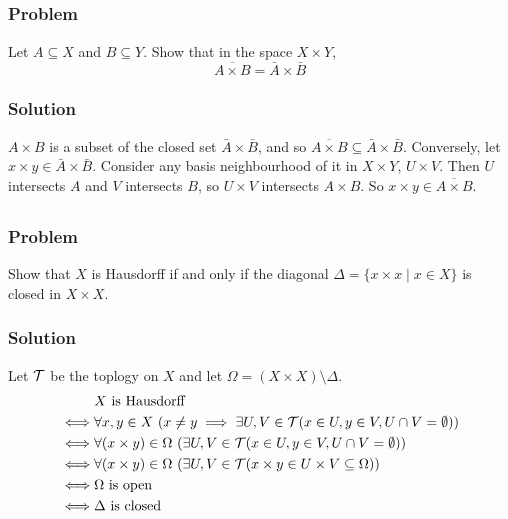 \setcounter{subsection}{8} %
\subsection{}
\subsubsection{Problem}
Let $A \subseteq X$ and $B \subseteq Y$. Show that in the space $X \times Y$,
\[\overline{A \times B} = \bar A \times \bar B \]
\subsubsection{Solution}
$A \times B$ is a subset of the closed set $\bar A \times \bar B$, and so $\overline{A \times B} \subseteq \bar A \times \bar B$. Conversely, let $x \times y \in \bar A \times \bar B$. Consider any basis neighbourhood of it in $X \times Y$, $U \times V$. Then $U$ intersects $A$ and $V$ intersects $B$, so $U \times V$ intersects $A \times B$. So $x \times y \in \overline{A \times B}$. 

\setcounter{subsection}{12} %
\subsection{}
\subsubsection{Problem}
Show that $X$ is Hausdorff if and only if the diagonal $\Delta = \{x \times x \mid x \in X\}$ is closed in $X \times X$.
\subsubsection{Solution}
Let $\mathcal T$ be the toplogy on $X$ and let $\Omega = (X \times X) \setminus \Delta$.
\begin{align*}
& X \textrm{ is Hausdorff} \\
\iff& \forall x,y \in X \ (x \neq y \implies \exists U, V \in \mathcal T (x \in U, y \in V, U \cap V = \emptyset)) \\
\iff& \forall (x \times y) \in \Omega \ ( \exists U, V \in \mathcal T (x \in U, y \in V, U \cap V = \emptyset)) \\
\iff& \forall (x \times y) \in \Omega \ ( \exists U, V \in \mathcal T ( x \times y \in U \times V \subseteq \Omega)) \\
\iff& \Omega \textrm{ is open} \\
\iff& \Delta \textrm{ is closed}
\end{align*}

